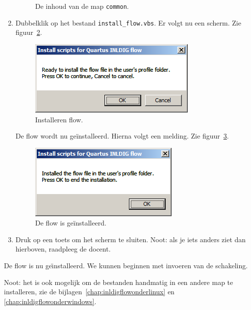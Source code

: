 \documentclass[a4paper,12pt,fleqn,twoside]{book}
\def\tutpicscale{0.455}
\begin{document}
\begin{enumerate}
\begin{figure}[H]
\caption{De inhoud van de map \lstinline|common|.}
\label{fig:008commonmap}
\end{figure}
\item Dubbelklik op het bestand \lstinline|install_flow.vbs|. Er volgt nu een scherm.
Zie figuur~\ref{fig:009readyinstallflow}.
\begin{figure}[H]
\centering
\includegraphics[scale=\tutpicscale]{009readyinstallflow}
\caption{Installeren flow.}
\label{fig:009readyinstallflow}
\end{figure}
De flow wordt nu ge\"installeerd. Hierna volgt een melding. Zie figuur~\ref{fig:009ZZflowinstalled}.
\begin{figure}[H]
\centering
\includegraphics[scale=\tutpicscale]{009ZZflowinstalled}
\caption{De flow is ge\"installeerd.}
\label{fig:009ZZflowinstalled}
\end{figure}

\item Druk op een toets om het scherm te sluiten. Noot: als je iets anders
ziet dan hierboven, raadpleeg de docent. 
\end{enumerate}

De flow is nu ge\"{\i}nstalleerd. We kunnen beginnen met invoeren van
de schakeling.
 
Noot: het is ook mogelijk om de bestanden handmatig in een andere map te
installeren, zie de bijlagen~\ref{chap:inldigflowonderlinux} en
\ref{chap:inldigflowonderwindows}. 
\end{document}
